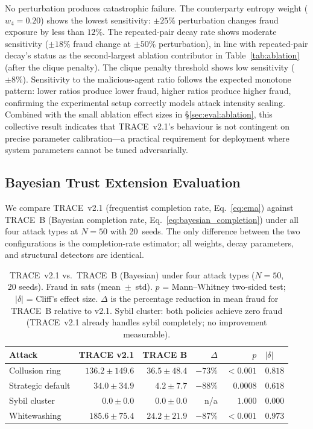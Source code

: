 \documentclass[sigconf,nonacm,10pt]{acmart}
\begin{document}
No perturbation produces catastrophic failure. The counterparty
entropy weight ($w_4 = 0.20$) shows the lowest sensitivity:
$\pm 25\%$ perturbation changes fraud exposure by less than
$12\%$. The repeated-pair decay rate shows moderate sensitivity
($\pm 18\%$ fraud change at $\pm 50\%$ perturbation), in line
with repeated-pair decay's status as the second-largest ablation
contributor in Table~\ref{tab:ablation} (after the clique
penalty). The clique penalty threshold shows low sensitivity
($\pm 8\%$). Sensitivity to the malicious-agent ratio follows
the expected monotone pattern: lower ratios produce lower fraud,
higher ratios produce higher fraud, confirming the experimental
setup correctly models attack intensity scaling. Combined with
the small ablation effect sizes in
\S\ref{sec:eval:ablation}, this collective result indicates
that TRACE~v2.1's behaviour is not contingent on precise
parameter calibration---a practical requirement for deployment
where system parameters cannot be tuned adversarially.

\subsection{Bayesian Trust Extension Evaluation}
\label{sec:eval:bayesian}

We compare TRACE~v2.1 (frequentist completion rate, Eq.~\ref{eq:ema})
against TRACE~B (Bayesian completion rate, Eq.~\ref{eq:bayesian_completion})
under all four attack types at $N{=}50$ with 20~seeds.
The only difference between the two configurations is the completion-rate
estimator; all weights, decay parameters, and structural detectors
are identical.

\begin{table}[t]
  \centering
  \caption{TRACE~v2.1 vs.\ TRACE~B (Bayesian) under four
    attack types ($N{=}50$, 20 seeds). Fraud in sats
    (mean~$\pm$~std). $p$ = Mann--Whitney two-sided test;
    $|\delta|$ = Cliff's effect size. $\Delta$ is the
    percentage reduction in mean fraud for TRACE~B relative to v2.1.
    Sybil cluster: both policies achieve zero fraud (TRACE~v2.1
    already handles sybil completely; no improvement measurable).}
  \label{tab:bayesian}
  \footnotesize
  \setlength{\tabcolsep}{4pt}
  \begin{tabular}{lrrrrl}
    \toprule
    Attack & TRACE v2.1 & TRACE B & $\Delta$ & $p$ & $|\delta|$ \\
    \midrule
    Collusion ring    & $136.2 \pm 149.6$ & $36.5 \pm 48.4$ & $-73\%$ & $<0.001$ & $0.818$ \\
    Strategic default & $34.0 \pm 34.9$   & $4.2 \pm 7.7$   & $-88\%$ & $0.0008$ & $0.618$ \\
    Sybil cluster     & $0.0 \pm 0.0$     & $0.0 \pm 0.0$   & n/a     & $1.000$  & $0.000$ \\
    Whitewashing      & $185.6 \pm 75.4$  & $24.2 \pm 21.9$ & $-87\%$ & $<0.001$ & $0.973$ \\
    \bottomrule
  \end{tabular}
\end{table}
\end{document}
